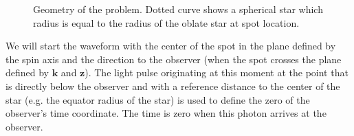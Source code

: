 \documentclass{wihuri}
\newcommand{\bmath}[1]{\boldsymbol{#1}}
\begin{document}
\begin{figure}
\centerline{}
\caption{Geometry of the problem. Dotted curve shows a spherical star which radius is equal to the radius of the oblate star at spot location.%
\label{fig:geom2}}
\end{figure}



We will  start the waveform with the center of the spot in the plane defined 
by the spin axis and the direction to the observer 
(when the spot crosses the plane defined by $\bmath{k}$ and $\bmath{z}$). The light pulse originating at this moment at the point that is directly below the observer and with a reference distance to the center of the star (e.g. the equator radius of the star) is used to define the zero of the observer's time coordinate. The time is zero when this photon arrives at the observer. 
\end{document}
